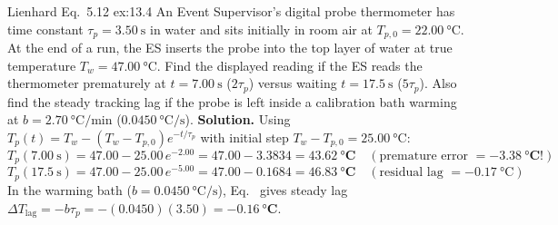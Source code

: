 \begin{workedexample}{Lienhard Eq.\ 5.12 }{ex:13.4}
An Event Supervisor's digital probe thermometer has time constant $\tau_p = \SI{3.50}{\second}$ in water and sits initially in room air at $T_{p,0} = \SI{22.00}{\celsius}$. At the end of a run, the ES inserts the probe into the top layer of water at true temperature $T_w = \SI{47.00}{\celsius}$. Find the displayed reading if the ES reads the thermometer prematurely at $t = \SI{7.00}{\second}$ ($2\tau_p$) versus waiting $t = \SI{17.5}{\second}$ ($5\tau_p$). Also find the steady tracking lag if the probe is left inside a calibration bath warming at $b = \SI{2.70}{\celsius\per\minute}$ ($\SI{0.0450}{\celsius\per\second}$).
\tcblower
\textbf{Solution.} Using $T_p(t) = T_w - (T_w - T_{p,0})e^{-t/\tau_p}$ with initial step $T_w - T_{p,0} = \SI{25.00}{\celsius}$:
\[
  T_p(\SI{7.00}{\second}) = 47.00 - 25.00\,e^{-2.00} = 47.00 - 3.3834 = \mathbf{\SI{43.62}{\celsius}} \quad (\text{premature error } = \mathbf{-\SI{3.38}{\celsius}}!)
\]
\[
  T_p(\SI{17.5}{\second}) = 47.00 - 25.00\,e^{-5.00} = 47.00 - 0.1684 = \mathbf{\SI{46.83}{\celsius}} \quad (\text{residual lag } = -\SI{0.17}{\celsius})
\]
In the warming bath ($b = \SI{0.0450}{\celsius\per\second}$), Eq.~ gives steady lag $\Delta T_{\mathrm{lag}} = -b\tau_p = -(0.0450)(3.50) = \mathbf{-\SI{0.16}{\celsius}}$.
\end{workedexample}

